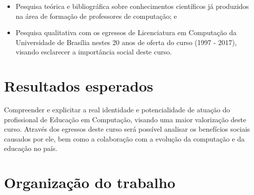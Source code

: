 \begin{itemize}
	\item Pesquisa teórica e bibliográfica sobre conhecimentos científicos já produzidos na área de formação de professores de computação; e
	\item Pesquisa qualitativa com os egressos de Licenciatura em Computação da Universidade de Brasília nestes 20 anos de oferta do curso (1997 - 2017), visando esclarecer a importância social deste curso.
	
\end{itemize}

\section{Resultados esperados}%


Compreender e explicitar a real identidade e potencialidade de atuação do profissional de Educação em Computação, visando uma maior valorização deste curso. Através dos egressos deste curso será possível analisar os benefícios sociais causados por ele, bem como a colaboração com a evolução da computação e da educação no país.



\section{Organização do trabalho}%

	




